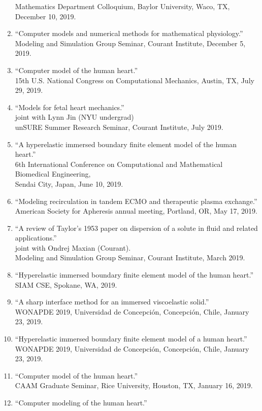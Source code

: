 \documentclass{article} %
\begin{document}
\begin{enumerate}
Mathematics Department Colloquium, Baylor University, Waco, TX, December 10, 2019.
\item ``Computer models and numerical methods for mathematical physiology.'' \\
Modeling and Simulation Group Seminar, Courant Institute, December 5, 2019.
\item ``Computer model of the human heart.'' \\
15th U.S. National Congress on Computational Mechanics, Austin, TX, July 29, 2019. 
\item ``Models for fetal heart mechanics.'' \\
joint with Lynn Jin (NYU undergrad) \\
unSURE Summer Research Seminar, Courant Institute, July 2019.
\item ``A hyperelastic immersed boundary finite element model of the human heart.'' \\
6th International Conference on Computational and Mathematical Biomedical Engineering,\\ Sendai City, Japan, June 10, 2019.
\item ``Modeling recirculation in tandem ECMO and therapeutic plasma exchange.'' \\
American Society for Apheresis annual meeting, Portland, OR, May 17, 2019.
\item ``A review of Taylor's 1953 paper on dispersion of a solute in fluid and related applications.'' \\
joint with Ondrej Maxian (Courant). \\
Modeling and Simulation Group Seminar, Courant Institute, March 2019.
\item ``Hyperelastic immersed boundary finite element model of the human heart.'' \\
SIAM CSE, Spokane, WA, 2019.
\item ``A sharp interface method for an immersed viscoelastic solid.'' \\
WONAPDE 2019, Universidad de Concepci\'on, Concepci\'on, Chile, January 23, 2019.
\item ``Hyperelastic immersed boundary finite element model of a human heart.'' \\
WONAPDE 2019, Universidad de Concepci\'on, Concepci\'on, Chile, January 23, 2019.
\item ``Computer model of the human heart.'' \\
CAAM Graduate Seminar, Rice University, Houston, TX, January 16, 2019.
\item ``Computer modeling of the human heart.'' \\

\end{enumerate}
\end{document}
